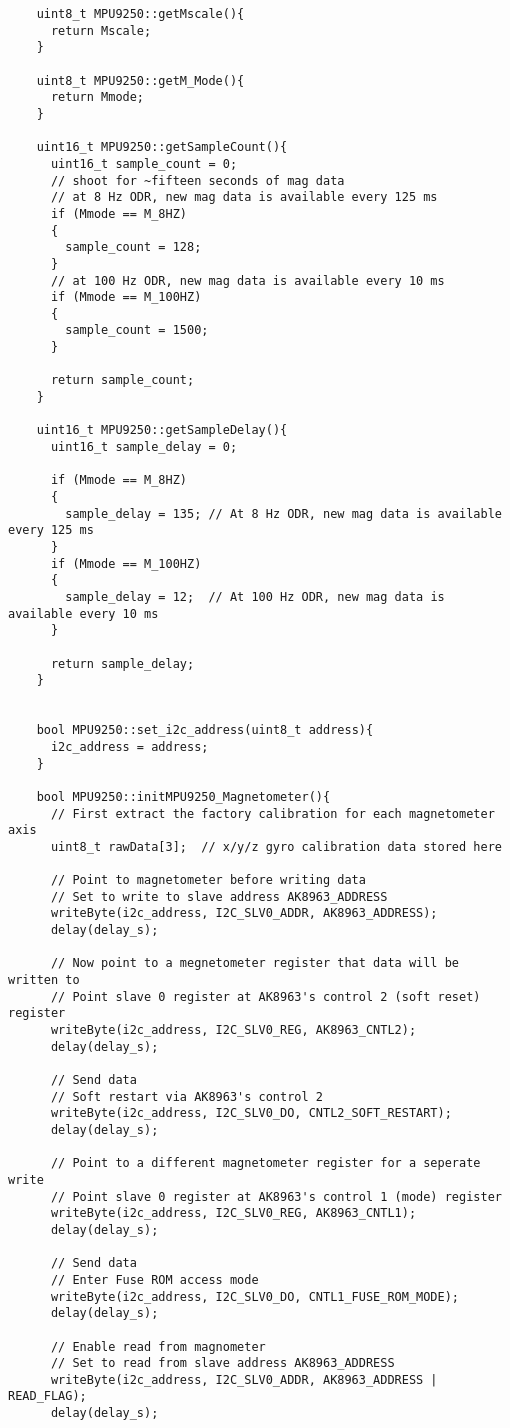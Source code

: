 \begin{lstlisting}
	uint8_t MPU9250::getMscale(){
	  return Mscale;
	}

	uint8_t MPU9250::getM_Mode(){
	  return Mmode;
	}

	uint16_t MPU9250::getSampleCount(){
	  uint16_t sample_count = 0;
	  // shoot for ~fifteen seconds of mag data
	  // at 8 Hz ODR, new mag data is available every 125 ms
	  if (Mmode == M_8HZ)
	  {
	    sample_count = 128;
	  }
	  // at 100 Hz ODR, new mag data is available every 10 ms
	  if (Mmode == M_100HZ)
	  {
	    sample_count = 1500;
	  }

	  return sample_count;
	}

	uint16_t MPU9250::getSampleDelay(){
	  uint16_t sample_delay = 0;

	  if (Mmode == M_8HZ)
	  {
	    sample_delay = 135; // At 8 Hz ODR, new mag data is available every 125 ms
	  }
	  if (Mmode == M_100HZ)
	  {
	    sample_delay = 12;  // At 100 Hz ODR, new mag data is available every 10 ms
	  }

	  return sample_delay;
	}


	bool MPU9250::set_i2c_address(uint8_t address){
	  i2c_address = address;
	}

	bool MPU9250::initMPU9250_Magnetometer(){
	  // First extract the factory calibration for each magnetometer axis
	  uint8_t rawData[3];  // x/y/z gyro calibration data stored here

	  // Point to magnetometer before writing data
	  // Set to write to slave address AK8963_ADDRESS
	  writeByte(i2c_address, I2C_SLV0_ADDR, AK8963_ADDRESS);
	  delay(delay_s);
	  
	  // Now point to a megnetometer register that data will be written to
	  // Point slave 0 register at AK8963's control 2 (soft reset) register
	  writeByte(i2c_address, I2C_SLV0_REG, AK8963_CNTL2);
	  delay(delay_s);

	  // Send data
	  // Soft restart via AK8963's control 2
	  writeByte(i2c_address, I2C_SLV0_DO, CNTL2_SOFT_RESTART);
	  delay(delay_s);

	  // Point to a different magnetometer register for a seperate write
	  // Point slave 0 register at AK8963's control 1 (mode) register
	  writeByte(i2c_address, I2C_SLV0_REG, AK8963_CNTL1);
	  delay(delay_s);
	  
	  // Send data
	  // Enter Fuse ROM access mode
	  writeByte(i2c_address, I2C_SLV0_DO, CNTL1_FUSE_ROM_MODE);
	  delay(delay_s);

	  // Enable read from magnometer
	  // Set to read from slave address AK8963_ADDRESS
	  writeByte(i2c_address, I2C_SLV0_ADDR, AK8963_ADDRESS | READ_FLAG);
	  delay(delay_s);


\end{lstlisting}

